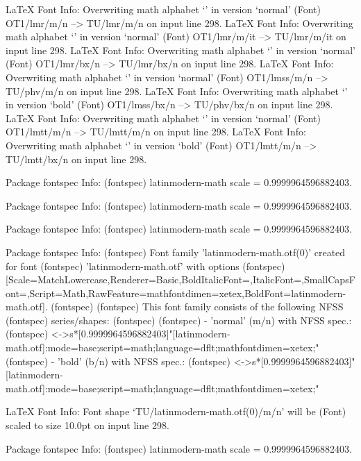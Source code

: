 LaTeX Font Info:    Overwriting math alphabet `\mathrm' in version `normal'
(Font)                  OT1/lmr/m/n --> TU/lmr/m/n on input line 298.
LaTeX Font Info:    Overwriting math alphabet `\mathit' in version `normal'
(Font)                  OT1/lmr/m/it --> TU/lmr/m/it on input line 298.
LaTeX Font Info:    Overwriting math alphabet `\mathbf' in version `normal'
(Font)                  OT1/lmr/bx/n --> TU/lmr/bx/n on input line 298.
LaTeX Font Info:    Overwriting math alphabet `\mathsf' in version `normal'
(Font)                  OT1/lmss/m/n --> TU/phv/m/n on input line 298.
LaTeX Font Info:    Overwriting math alphabet `\mathsf' in version `bold'
(Font)                  OT1/lmss/bx/n --> TU/phv/bx/n on input line 298.
LaTeX Font Info:    Overwriting math alphabet `\mathtt' in version `normal'
(Font)                  OT1/lmtt/m/n --> TU/lmtt/m/n on input line 298.
LaTeX Font Info:    Overwriting math alphabet `\mathtt' in version `bold'
(Font)                  OT1/lmtt/m/n --> TU/lmtt/bx/n on input line 298.

Package fontspec Info: 
(fontspec)             latinmodern-math scale = 0.9999964596882403.


Package fontspec Info: 
(fontspec)             latinmodern-math scale = 0.9999964596882403.


Package fontspec Info: 
(fontspec)             latinmodern-math scale = 0.9999964596882403.


Package fontspec Info: 
(fontspec)             Font family 'latinmodern-math.otf(0)' created for font
(fontspec)             'latinmodern-math.otf' with options
(fontspec)             [Scale=MatchLowercase,Renderer=Basic,BoldItalicFont={},ItalicFont={},SmallCapsFont={},Script=Math,RawFeature={mathfontdimen=xetex},BoldFont={latinmodern-math.otf}].
(fontspec)              
(fontspec)              This font family consists of the following NFSS
(fontspec)             series/shapes:
(fontspec)              
(fontspec)             - 'normal' (m/n) with NFSS spec.:
(fontspec)             <->s*[0.9999964596882403]"[latinmodern-math.otf]:mode=base;script=math;language=dflt;mathfontdimen=xetex;"
(fontspec)             - 'bold' (b/n) with NFSS spec.:
(fontspec)             <->s*[0.9999964596882403]"[latinmodern-math.otf]:mode=base;script=math;language=dflt;mathfontdimen=xetex;"

LaTeX Font Info:    Font shape `TU/latinmodern-math.otf(0)/m/n' will be
(Font)              scaled to size 10.0pt on input line 298.

Package fontspec Info: 
(fontspec)             latinmodern-math scale = 0.9999964596882403.


